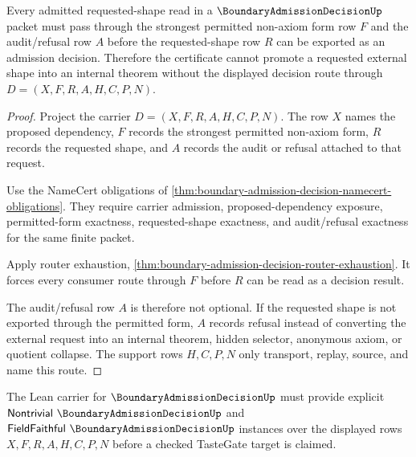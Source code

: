 \begin{theorem}
\label{thm:boundary-admission-decision-obligation-axis-sync}
Every admitted requested-shape read in a $\BoundaryAdmissionDecisionUp$ packet must pass through the strongest permitted non-axiom form row $F$ and the audit/refusal row $A$ before the requested-shape row $R$ can be exported as an admission decision. Therefore the certificate cannot promote a requested external shape into an internal theorem without the displayed decision route through $D=(X,F,R,A,H,C,P,N)$.
\end{theorem}
\begin{proof}
Project the carrier $D=(X,F,R,A,H,C,P,N)$. The row $X$ names the proposed dependency, $F$ records the strongest permitted non-axiom form, $R$ records the requested shape, and $A$ records the audit or refusal attached to that request.

Use the NameCert obligations of \autoref{thm:boundary-admission-decision-namecert-obligations}. They require carrier admission, proposed-dependency exposure, permitted-form exactness, requested-shape exactness, and audit/refusal exactness for the same finite packet.

Apply router exhaustion, \autoref{thm:boundary-admission-decision-router-exhaustion}. It forces every consumer route through $F$ before $R$ can be read as a decision result.

The audit/refusal row $A$ is therefore not optional. If the requested shape is not exported through the permitted form, $A$ records refusal instead of converting the external request into an internal theorem, hidden selector, anonymous axiom, or quotient collapse. The support rows $H,C,P,N$ only transport, replay, source, and name this route.
\end{proof}



The Lean carrier for $\BoundaryAdmissionDecisionUp$ must provide explicit $\mathsf{Nontrivial}\ \BoundaryAdmissionDecisionUp$ and $\mathsf{FieldFaithful}\ \BoundaryAdmissionDecisionUp$ instances over the displayed rows $X,F,R,A,H,C,P,N$ before a checked TasteGate target is claimed.

